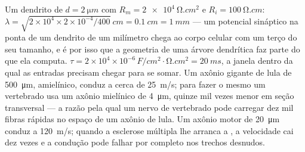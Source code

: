 \begin{example}\label{ex:b3:nervous-systems:numbers}
Um dendrito de $d = \qty{2}{\micro m}$ com $R_{m} = \qty{2e4}{\ohm.cm^2}$
e $R_{i} = \qty{100}{\ohm.cm}$: $\lambda = \sqrt{2\times 10^{4}\times
2\times 10^{-4}/400}\ \unit{cm} = \qty{0.1}{cm} = \qty{1}{mm}$ --- um
potencial sináptico na ponta de um dendrito de um milímetro chega ao
corpo celular com um terço do seu tamanho, e é por isso que a geometria
de uma árvore dendrítica faz parte do que ela computa. $\tau = 2\times 10^{4}\times
10^{-6}\,\unit{F/cm^2}\cdot\unit{\ohm.cm^2} = \qty{20}{ms}$,
a janela dentro da qual as entradas precisam chegar para se somar. Um
axônio gigante de lula de \qty{500}{\micro m}, amielínico, conduz a
cerca de \qty{25}{m/s}; para fazer o mesmo um vertebrado usa um axônio
mielínico de \qty{4}{\micro m}, quinze mil vezes menor em seção
transversal --- a razão pela qual um nervo de vertebrado pode carregar
dez mil fibras rápidas no espaço de um axônio de lula. Um axônio motor
de \qty{20}{\micro m} conduz a \qty{120}{m/s}; quando a esclerose
múltipla lhe arranca a , a velocidade cai dez vezes e a condução
pode falhar por completo nos trechos desnudos.
\end{example}

